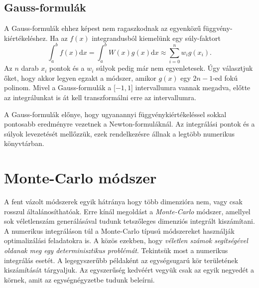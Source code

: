 \documentclass[12pt]{article}
\theoremstyle{plain}
\begin{document}
\subsection{Gauss-formulák}
A Gauss-formulák ehhez képest nem ragaszkodnak az egyenközű függvény-kiértékeléshez. Ha az $f(x)$ integrandusból kiemelünk egy súly-faktort
\begin{equation}
    \label{nc}
    \int_a^b f(x) \text{d}x  = \int_a^b W(x)g(x) \text{d}x \approx \sum_{i=0} ^n w_i g(x_i).
\end{equation}
Az $n$ darab $x_i$ pontok és a $w_i$ súlyok pedig már nem egyenletesek. Úgy választjuk őket, hogy akkor legyen egzakt a módszer, amikor $g(x)$ egy $2n-1$-ed fokú polinom. Mivel a Gauss-formulák a [$-1, 1$] intervallumra vannak megadva, előtte az integrálunkat is át kell transzformálni erre az intervallumra. 

A Gauss-formulák előnye, hogy ugyanannyi függvénykiértékeléssel sokkal pontosabb eredményre vezetnek a Newton-formuláknál. Az integrálási pontok és a súlyok levezetését mellőzzük, ezek rendelkezésre állnak a legtöbb numerikus könyvtárban. 
\section{Monte-Carlo módszer}
A fent vázolt módszerek egyik hátránya hogy több dimenzióra nem, vagy csak rosszul általánosíthatóak. Erre kínál megoldást a {\em Monte-Carlo} módszer, amellyel sok véletlenszám generálásával tudunk tetszőleges dimenziós integrált kiszámítani. A numerikus integráláson túl a Monte-Carlo típusú módszereket használják optimalizálási feladatokra is. A közös ezekben, hogy {\em véletlen számok segítségével oldanak meg egy determinisztikus problémát}. Tekintsük most a numerikus integrálás esetét. A legegyszerűbb példaként az egységsugarú kör területének kiszámítását tárgyaljuk. Az egyszerűség kedvéért vegyük csak az egyik negyedét a körnek, amit az egységnégyzetbe tudunk beleírni. 
\end{document}
